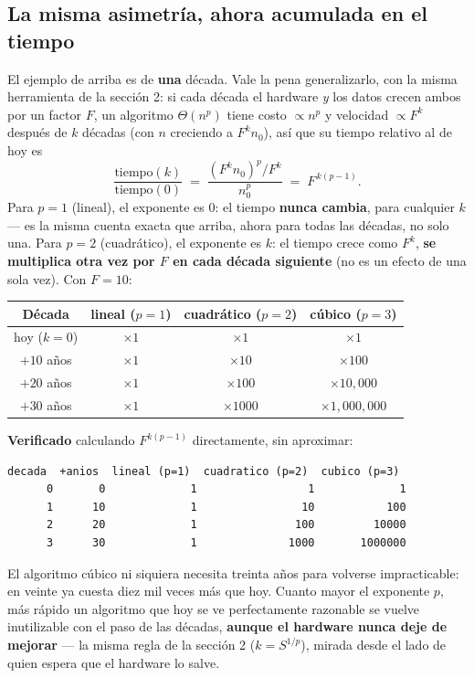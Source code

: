 \documentclass[11pt]{article}
\begin{document}
\subsection*{La misma asimetría, ahora acumulada en el tiempo}

El ejemplo de arriba es de \textbf{una} década. Vale la pena generalizarlo, con la misma herramienta de la
sección 2: si cada década el hardware \emph{y} los datos crecen ambos por un factor $F$, un algoritmo
$\Theta(n^p)$ tiene costo $\propto n^p$ y velocidad $\propto F^k$ después de $k$ décadas (con $n$ creciendo
a $F^k n_0$), así que su tiempo relativo al de hoy es
\[
\frac{\text{tiempo}(k)}{\text{tiempo}(0)} \;=\; \frac{(F^k n_0)^p / F^k}{n_0^p} \;=\; F^{\,k(p-1)}.
\]
Para $p=1$ (lineal), el exponente es $0$: el tiempo \textbf{nunca cambia}, para cualquier $k$ --- es la
misma cuenta exacta que arriba, ahora para todas las décadas, no solo una. Para $p=2$ (cuadrático), el
exponente es $k$: el tiempo crece como $F^k$, \textbf{se multiplica otra vez por $F$ en cada década
siguiente} (no es un efecto de una sola vez). Con $F=10$:

\begin{center}
\begin{tabular}{@{}cccc@{}}
\toprule
\textbf{Década} & \textbf{lineal ($p{=}1$)} & \textbf{cuadrático ($p{=}2$)} & \textbf{cúbico ($p{=}3$)} \\
\midrule
hoy ($k{=}0$) & $\times 1$ & $\times 1$ & $\times 1$ \\
$+10$ años & $\times 1$ & $\times 10$ & $\times 100$ \\
$+20$ años & $\times 1$ & $\times 100$ & $\times 10{,}000$ \\
$+30$ años & $\times 1$ & $\times 1000$ & $\times 1{,}000{,}000$ \\
\bottomrule
\end{tabular}
\end{center}

\textbf{Verificado} calculando $F^{k(p-1)}$ directamente, sin aproximar:
\begin{lstlisting}[style=salida]
 decada  +anios  lineal (p=1)  cuadratico (p=2)  cubico (p=3)
      0       0             1                 1             1
      1      10             1                10           100
      2      20             1               100         10000
      3      30             1              1000       1000000
\end{lstlisting}

El algoritmo cúbico ni siquiera necesita treinta años para volverse impracticable: en veinte ya cuesta diez
mil veces más que hoy. Cuanto mayor el exponente $p$, más rápido un algoritmo que hoy se ve perfectamente
razonable se vuelve inutilizable con el paso de las décadas, \textbf{aunque el hardware nunca deje de
mejorar} --- la misma regla de la sección 2 ($k=S^{1/p}$), mirada desde el lado de quien espera que el
hardware lo salve.
\end{document}

